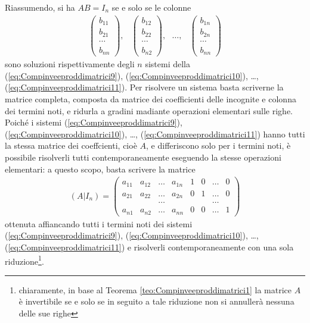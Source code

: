 \documentclass{book}
\theoremstyle{definition}
\theoremstyle{plain}
\begin{document}
Riassumendo, si ha $AB=I_n$ se e solo se le colonne
\begin{eqnarray*}
  \begin{pmatrix}
    b_{11}\\
    b_{21}\\
    \cdots\\
    b_{nn}
  \end{pmatrix}, &
                   \begin{pmatrix}
                     b_{12}\\
                     b_{22}\\
                     \cdots\\
                     b_{n2}
                   \end{pmatrix}, \text{ } \dots, &
                                            \begin{pmatrix}
                                              b_{1n}\\
                                              b_{2n}\\
                                              \cdots\\

                                              b_{nn}
                                            \end{pmatrix}
\end{eqnarray*}
sono soluzioni rispettivamente degli $n$ sistemi della
(\ref{eq:Compinveeproddimatrici9}),
(\ref{eq:Compinveeproddimatrici10}),
\dots, (\ref{eq:Compinveeproddimatrici11}). Per risolvere un sistema
basta scriverne la matrice completa, composta da matrice dei
coefficienti delle incognite e colonna dei termini noti, e ridurla
a gradini madiante operazioni elementari sulle righe. Poiché i
sistemi (\ref{eq:Compinveeproddimatrici9}),
(\ref{eq:Compinveeproddimatrici10}),
\dots, (\ref{eq:Compinveeproddimatrici11}) hanno tutti la stessa
matrice dei coeffcienti, cioè $A$, e differiscono solo per i
termini noti, è possibile risolverli tutti contemporaneamente
eseguendo la stesse operazioni elementari: a questo scopo, basta
scrivere la matrice
\begin{eqnarray}
  \label{eq:Compinveeproddimatrici12}
  (A| I_n)=\left(
  \begin{array}{cccc|cccc}
    a_{11}& a_{12}& \dots& a_{1n}& 1& 0& \dots&0 \\
    a_{21} & a_{22} & \dots &a_{2n} & 0 & 1 &\dots &0\\
          &&\dots&&&&\dots\\
    a_{n1}& a_{n2} & \dots&a_{nn} & 0 & 0 & \dots & 1
  \end{array}
  \right)
\end{eqnarray}
ottenuta affiancando tutti i termini noti dei sistemi
(\ref{eq:Compinveeproddimatrici9}),
(\ref{eq:Compinveeproddimatrici10}),
\dots, (\ref{eq:Compinveeproddimatrici11}) e risolverli
contemporaneamente con una sola riduzione\footnote{chiaramente,
  in base al Teorema \ref{teo:Compinveeproddimatrici1} la matrice
  $A$ è invertibile se e solo se in seguito a tale riduzione non si
  annullerà nessuna delle sue righe}.
\end{document}
